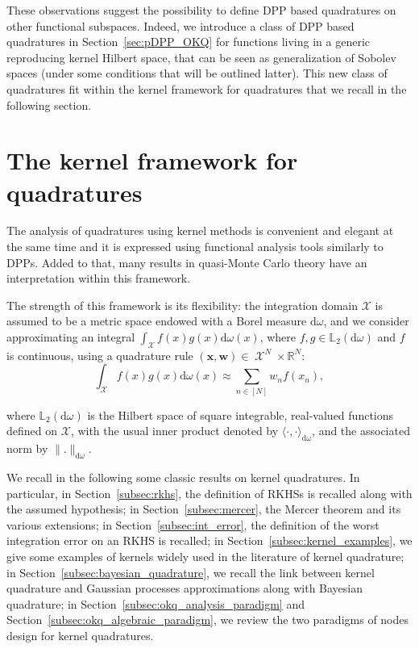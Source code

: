 \documentclass[twoside,11pt]{book}
\DeclareMathOperator{\X}{\mathcal{X}}
\begin{document}
These observations suggest the possibility to define DPP based quadratures on other functional subspaces. Indeed, we introduce a class of DPP based quadratures in Section~\ref{sec:pDPP_OKQ} for functions living in a generic reproducing kernel Hilbert space, that can be seen as generalization of Sobolev spaces (under some conditions that will be outlined latter).
This new class of quadratures fit within the kernel framework for quadratures that we recall in the following section.

\section{The kernel framework for quadratures}


The analysis of quadratures using kernel methods is convenient and elegant at the same time and it is expressed using functional analysis tools similarly to DPPs. Added to that, many results in quasi-Monte Carlo theory have an interpretation within this framework. 

The strength of this framework is its flexibility: the integration domain $\mathcal{X}$ is assumed to be a metric space endowed with a Borel measure $\mathrm{d}\omega$, and we consider approximating an integral $\displaystyle \int_{\X} f(x)g(x)\mathrm{d}\omega(x)$, where $f,g \in \mathbb{L}_{2}(\mathrm{d}\omega)$ and $f$  is continuous, using a quadrature rule $(\bm{x}, \bm{w}) \in \X^{N} \times \mathbb{R}^{N}$:
\begin{equation}\label{eq:int_error}
\int_{\X} f(x)g(x)\mathrm{d}\omega(x) \approx \sum\limits_{n \in [N]} w_{n} f(x_{n}),
\end{equation}

where $\mathbb{L}_{2}(\mathrm{d}\omega)$ is the Hilbert space of square integrable, real-valued functions defined on $\mathcal{X}$, with the usual inner product denoted by $\langle \cdot, \cdot \rangle_{\mathrm{d}\omega}$, and the associated norm by $\|.\|_{\mathrm{d}\omega}$.


We recall in the following some classic results on kernel quadratures. In particular, in Section~\ref{subsec:rkhs},  the definition of RKHSs is recalled along with the assumed hypothesis; in Section~\ref{subsec:mercer}, the Mercer theorem and its various extensions; in Section~\ref{subsec:int_error}, the definition of the worst integration error on an RKHS is recalled; in Section~\ref{subsec:kernel_examples}, we give some examples of kernels widely used in the literature of kernel quadrature; in Section~\ref{subsec:bayesian_quadrature}, we recall the link between kernel quadrature and Gaussian processes approximations along with Bayesian quadrature; in Section~\ref{subsec:okq_analysis_paradigm} and Section~\ref{subsec:okq_algebraic_paradigm}, we review the two paradigms of nodes design for kernel quadratures.
\end{document}
